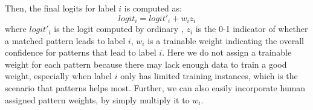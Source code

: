 Then, the final logits for label $i$ is computed as: 
\begin{equation}
logit_i = logit'_i + w_i z_i
\end{equation}
where $logit'_i$ is the logit computed by ordinary \NN, $z_i$ is the 0-1 indicator of whether a matched pattern leads to label $i$, $w_i$ is a trainable weight indicating the overall confidence for patterns that lead to label $i$. Here we do not assign a trainable weight for each pattern because there may lack enough data to train a good weight, especially when label $i$ only has limited training instances, which is the scenario that \RE patterns helps most. Further, we can also easily incorporate human assigned pattern weights, by simply multiply it to $w_i$.
